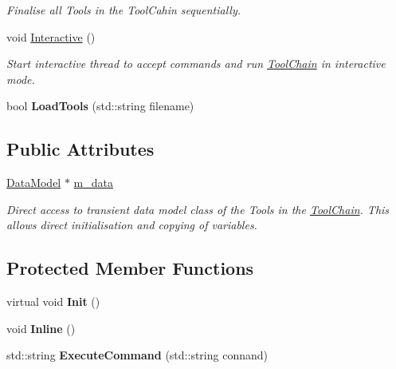 \begin{DoxyCompactItemize}
\begin{DoxyCompactList}\small\item\em Finalise all Tools in the Tool\-Cahin sequentially. \end{DoxyCompactList}\item 
\hypertarget{classToolChain_a9bb47b83b6b85c3b0fab75af0cda19bf}{void \hyperlink{classToolChain_a9bb47b83b6b85c3b0fab75af0cda19bf}{Interactive} ()}\label{classToolChain_a9bb47b83b6b85c3b0fab75af0cda19bf}

\begin{DoxyCompactList}\small\item\em Start interactive thread to accept commands and run \hyperlink{classToolChain}{Tool\-Chain} in interactive mode. \end{DoxyCompactList}\item 
\hypertarget{classToolChain_ac1b120b81163d9e00ee778fbc40ddb23}{bool {\bfseries Load\-Tools} (std\-::string filename)}\label{classToolChain_ac1b120b81163d9e00ee778fbc40ddb23}

\end{DoxyCompactItemize}
\subsection*{Public Attributes}
\begin{DoxyCompactItemize}
\item 
\hypertarget{classToolChain_a29d8574ddfd60c6fee03891c1eb6848c}{\hyperlink{classDataModel}{Data\-Model} $\ast$ \hyperlink{classToolChain_a29d8574ddfd60c6fee03891c1eb6848c}{m\-\_\-data}}\label{classToolChain_a29d8574ddfd60c6fee03891c1eb6848c}

\begin{DoxyCompactList}\small\item\em Direct access to transient data model class of the Tools in the \hyperlink{classToolChain}{Tool\-Chain}. This allows direct initialisation and copying of variables. \end{DoxyCompactList}\end{DoxyCompactItemize}
\subsection*{Protected Member Functions}
\begin{DoxyCompactItemize}
\item 
\hypertarget{classToolChain_ab705c173cb72d1d35865f7435bcb9f0b}{virtual void {\bfseries Init} ()}\label{classToolChain_ab705c173cb72d1d35865f7435bcb9f0b}

\item 
\hypertarget{classToolChain_ac1cc0e9d9f6b2d23adb9eab2d7a58119}{void {\bfseries Inline} ()}\label{classToolChain_ac1cc0e9d9f6b2d23adb9eab2d7a58119}

\item 
\hypertarget{classToolChain_a6ce65465365bf2b6da10b5d28028afcb}{std\-::string {\bfseries Execute\-Command} (std\-::string connand)}\label{classToolChain_a6ce65465365bf2b6da10b5d28028afcb}

\end{DoxyCompactItemize}
